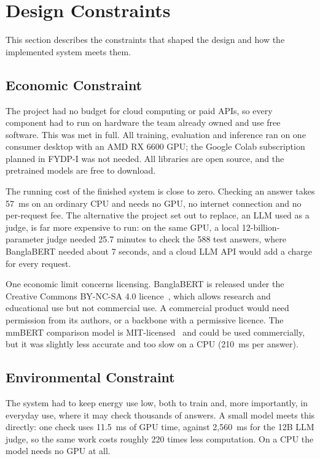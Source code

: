 \section{Design Constraints}
\label{sec:constraints}

This section describes the constraints that shaped the design and how the
implemented system meets them.

\subsection{Economic Constraint}

The project had no budget for cloud computing or paid APIs, so every component
had to run on hardware the team already owned and use free software. This was
met in full. All training, evaluation and inference ran on one consumer desktop
with an AMD RX 6600 GPU; the Google Colab subscription planned in FYDP-I was not
needed. All libraries are open source, and the pretrained models are free to
download.

The running cost of the finished system is close to zero. Checking an answer
takes 57~ms on an ordinary CPU and needs no GPU, no internet connection and no
per-request fee. The alternative the project set out to replace, an LLM used as
a judge, is far more expensive to run: on the same GPU, a local
12-billion-parameter judge needed 25.7 minutes to check the 588 test answers, where
BanglaBERT needed about 7 seconds, and a cloud LLM API would add a charge for
every request.

One economic limit concerns licensing. BanglaBERT is released under the Creative
Commons BY-NC-SA 4.0 licence~\cite{banglabert}, which allows research and
educational use but not commercial use. A commercial product would need
permission from its authors, or a backbone with a permissive licence. The mmBERT
comparison model is MIT-licensed~\cite{mmbert} and could be used commercially,
but it was slightly less accurate and too slow on a CPU (210~ms per answer).

\subsection{Environmental Constraint}

The system had to keep energy use low, both to train and, more importantly, in
everyday use, where it may check thousands of answers. A small model meets this
directly: one check uses 11.5~ms of GPU time, against 2,560~ms for the 12B LLM
judge, so the same work costs roughly 220 times less computation. On a CPU the
model needs no GPU at all.

